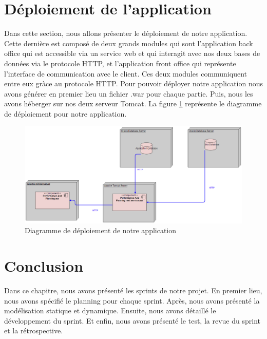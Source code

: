 \section{Déploiement de l'application}
Dans cette section, nous allons présenter le déploiement de notre application. Cette dernière est composé de deux grands modules qui sont l'application back office qui est accessible via un service web et qui interagit avec nos deux bases de données via le protocole HTTP, et l'application front office qui représente l'interface de communication avec le client. Ces deux modules communiquent entre eux gràce au protocole HTTP. Pour pouvoir déployer notre application nous avons générer en premier lieu un fichier .war pour chaque partie. Puis, nous les avons héberger sur nos deux serveur Tomcat. La figure \ref{code_deploiement_diag} représente le diagramme de déploiement pour notre application.
\begin{figure}[H]
  \centering
 \includegraphics[scale=0.55]{figures/diagrams/Deploiment/deploiment_diag.PNG}
 \caption{Diagramme de déploiement de notre application}
 \label{code_deploiement_diag}
\end{figure}
\section{Conclusion}
Dans ce chapitre, nous avons présenté les sprints de notre projet. En premier lieu, nous avons spécifié le planning pour chaque sprint. Après, nous avons présenté la modélisation statique et dynamique. Ensuite, nous avons détaillé le développement du sprint. Et enfin, nous avons présenté le test, la revue du sprint et la rétrospective.